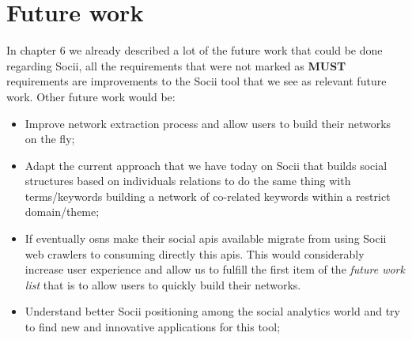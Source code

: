 \section{Future work}
In chapter 6 we already described a lot of the future work that could be done regarding Socii, all the requirements that were not marked as \textbf{MUST} requirements
are improvements to the Socii tool that we see as relevant future work. Other future work would be:

\begin{itemize}
    \item Improve network extraction process and allow users to build their networks on the fly;
    \item Adapt the current approach that we have today on Socii that builds social structures based on individuals relations to do the same thing with terms/keywords
    building a network of co-related keywords within a restrict domain/theme;
    \item If eventually \glspl{osn} make their social \glspl{api} available migrate from using Socii web crawlers to consuming directly this \glspl{api}. This would
    considerably increase user experience and allow us to fulfill the first item of the \textit{future work list} that is to allow users to quickly build their networks.
    \item Understand better Socii positioning among the social analytics world and try to find new and innovative applications for this tool;
\end{itemize}

